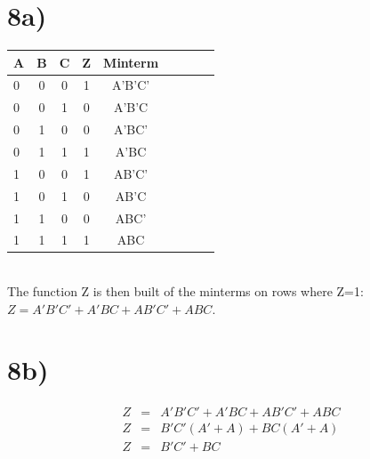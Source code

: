 \documentclass[a4paper,11pt]{article}
\begin{document}
\section*{8a)}
\begin{tabular}{| l | c | c | c | c | c | c | c | c |}
  \hline	
    A & B & C & Z & Minterm \\  \hline \hline
    0 & 0 & 0 & 1 & A'B'C'  \\  \hline
    0 & 0 & 1 & 0 & A'B'C  \\  \hline
    0 & 1 & 0 & 0 & A'BC'  \\  \hline
    0 & 1 & 1 & 1 & A'BC  \\  \hline
    1 & 0 & 0 & 1 & AB'C'  \\  \hline
    1 & 0 & 1 & 0 & AB'C  \\  \hline
    1 & 1 & 0 & 0 & ABC'  \\  \hline
    1 & 1 & 1 & 1 & ABC  \\  \hline
\end{tabular} \\

The function Z is then built of the minterms on rows where Z=1:  $Z = A'B'C' + A'BC + AB'C' + ABC$.

\section*{8b)}
\begin{eqnarray}
Z &=& A'B'C' + A'BC + AB'C' + ABC \\
Z &=& B'C'(A' + A) + BC(A' + A) \\
Z &=& B'C' + BC 
\end{eqnarray}


\end{document}
